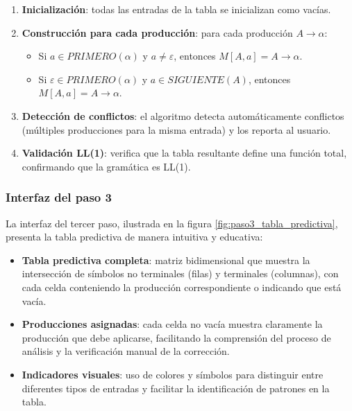 \begin{enumerate}
    \item \textbf{Inicialización}: todas las entradas de la tabla se inicializan como vacías.
    \item \textbf{Construcción para cada producción}: para cada producción $A \rightarrow \alpha$:
    \begin{itemize}
        \item Si $a \in PRIMERO(\alpha)$ y $a \neq \varepsilon$, entonces $M[A,a] = A \rightarrow \alpha$.
        \item Si $\varepsilon \in PRIMERO(\alpha)$ y $a \in SIGUIENTE(A)$, entonces $M[A,a] = A \rightarrow \alpha$.
    \end{itemize}
    \item \textbf{Detección de conflictos}: el algoritmo detecta automáticamente conflictos (múltiples producciones para la misma entrada) y los reporta al usuario.
    \item \textbf{Validación LL(1)}: verifica que la tabla resultante define una función total, confirmando que la gramática es LL(1).
\end{enumerate}

\subsubsection{Interfaz del paso 3}

La interfaz del tercer paso, ilustrada en la figura \ref{fig:paso3_tabla_predictiva}, presenta la tabla predictiva de manera intuitiva y educativa:

\begin{itemize}
    \item \textbf{Tabla predictiva completa}: matriz bidimensional que muestra la intersección de símbolos no terminales (filas) y terminales (columnas), con cada celda conteniendo la producción correspondiente o indicando que está vacía.
    \item \textbf{Producciones asignadas}: cada celda no vacía muestra claramente la producción que debe aplicarse, facilitando la comprensión del proceso de análisis y la verificación manual de la corrección.
    \item \textbf{Indicadores visuales}: uso de colores y símbolos para distinguir entre diferentes tipos de entradas y facilitar la identificación de patrones en la tabla.
\end{itemize}

